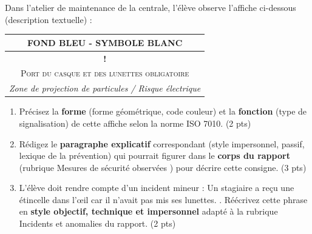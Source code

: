 \documentclass[11pt]{article}
\begin{document}
\begin{exercice}
Dans l'atelier de maintenance de la centrale, l'élève observe l'affiche ci-dessous (description textuelle) :

\begin{center}
\begin{tabular}{|c|}
\hline
\textbf{FOND BLEU - SYMBOLE BLANC} \\
\hline
\hspace{1cm} \textcircled{\large \textbf{!}} \hspace{1cm} \\
\hline
\textsc{Port du casque et des lunettes obligatoire} \\
\hline
\textit{Zone de projection de particules / Risque électrique} \\
\hline
\end{tabular}
\end{center}

\begin{enumerate}
    \item Précisez la \textbf{forme} (forme géométrique, code couleur) et la \textbf{fonction} (type de signalisation) de cette affiche selon la norme ISO 7010. (2 pts)
    \item Rédigez le \textbf{paragraphe explicatif} correspondant (style impersonnel, passif, lexique de la prévention) qui pourrait figurer dans le \textbf{corps du rapport} (rubrique \og Mesures de sécurité observées \fg) pour décrire cette consigne. (3 pts)
    \item L'élève doit rendre compte d'un incident mineur : \og Un stagiaire a reçu une étincelle dans l'œil car il n'avait pas mis ses lunettes. \fg. Réécrivez cette phrase en \textbf{style objectif, technique et impersonnel} adapté à la rubrique \og Incidents et anomalies \fg du rapport. (2 pts)
\end{enumerate}
\end{exercice}
\end{document}

